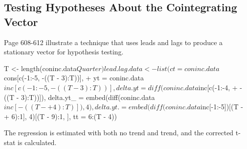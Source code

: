 \documentclass[a4paper]{article}
\begin{document}
\subsection{Testing Hypotheses About the Cointegrating Vector}
Page 608-612 illustrate a technique that uses leads and lags to produce a stationary
vector for hypothesis testing.
\begin{Schunk}
\begin{Sinput}
 T <- length(coninc.data$Quarter)
 lead.lag.data <- list(ct = coninc.data$cons[c(-1:-5, -((T - 3):T))], 
+     yt = coninc.data$inc[c(-1:-5, -((T - 3):T))], delta.yt = diff(coninc.data$inc[c(-1:-4, 
+         -((T - 3):T))]), delta.yt_ = embed(diff(coninc.data$inc[-((T - 
+         4):T)]), 4), delta.yt. = embed(diff(coninc.data$inc[-1:-5])[(T - 
+         6):1], 4)[(T - 9):1, ], tt = 6:(T - 4))
\end{Sinput}
\end{Schunk}
The regression is estimated with both no trend and trend, and the corrected t-stat is calculated.
\end{document}
